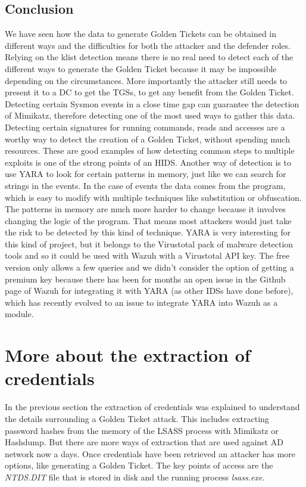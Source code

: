 \subsection{Conclusion}
We have seen how the data to generate Golden Tickets can be obtained in different ways and the difficulties for both the attacker and the defender roles.
\linej
\linej
Relying on the klist detection means there is no real need to detect each of the different ways to generate the Golden Ticket because it may be impossible depending on the circumstances. More importantly the attacker still needs to present it to a DC to get the TGSs, to get any benefit from the Golden Ticket.
\linej
Detecting certain Sysmon events in a close time gap can guarantee the detection of Mimikatz, therefore detecting one of the most used ways to gather this data. Detecting certain signatures for running commands, reads and accesses are a worthy way to detect the creation of a Golden Ticket, without spending much resources.
\linej
These are good examples of how detecting common steps to multiple exploits is one of the strong points of an HIDS.
\linej
\linej
Another way of detection is to use YARA to look for certain patterns in memory, just like we can search for strings in the events. In the case of events the data comes from the program, which is easy to modify with multiple techniques like substitution or obfuscation. The patterns in memory are much more harder to change because it involves changing the logic of the program. That means most attackers would just take the risk to be detected by this kind of technique.
\linej
YARA is very interesting for this kind of project, but it belongs to the Virustotal pack of malware detection tools and so it could be used with Wazuh with a Virustotal API key. The free version only allows a few queries and we didn't consider the option of getting a premium key because there has been for months an open issue in the Github page of Wazuh for integrating it with YARA (as other IDSs have done before), which has recently evolved to an issue to integrate YARA into Wazuh as a module\cite{yara_module}.


\section{More about the extraction of credentials}
In the previous section the extraction of credentials was explained to understand the details surrounding a Golden Ticket attack. This includes extracting password hashes from the memory of the LSASS process with Mimikatz or Hashdump. But there are more ways of extraction that are used against AD network now a days.
\linej
Once credentials have been retrieved an attacker has more options, like generating a Golden Ticket.
The key points of access are the \textit{NTDS.DIT} file that is stored in disk and the running process \textit{lsass.exe}.

